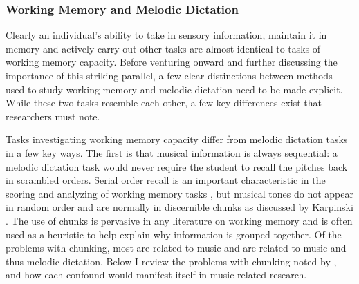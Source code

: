 \documentclass[12pt,]{book}
\begin{document}
\hypertarget{working-memory-and-melodic-dictation}{%
\subsubsection{Working Memory and Melodic Dictation}\label{working-memory-and-melodic-dictation}}

Clearly an individual's ability to take in sensory information, maintain it in memory and actively carry out other tasks are almost identical to tasks of working memory capacity.
Before venturing onward and further discussing the importance of this striking parallel, a few clear distinctions between methods used to study working memory and melodic dictation need to be made explicit.
While these two tasks resemble each other, a few key differences exist that researchers must note.

Tasks investigating working memory capacity differ from melodic dictation tasks in a few key ways.
The first is that musical information is always sequential: a melodic dictation task would never require the student to recall the pitches back in scrambled orders.
Serial order recall is an important characteristic in the scoring and analyzing of working memory tasks \citep{conwayWorkingMemorySpan2005}, but musical tones do not appear in random order and are normally in discernible chunks as discussed by Karpinski \citep{karpinskiAuralSkillsAcquisition2000}.
The use of chunks is pervasive in any literature on working memory and is often used as a heuristic to help explain why information is grouped together.
Of the problems with chunking, most are related to music and are related to music and thus melodic dictation.
Below I review the problems with chunking noted by \citet{cowanWorkingMemoryCapacity2005}, and how each confound would manifest itself in music related research.
\end{document}
